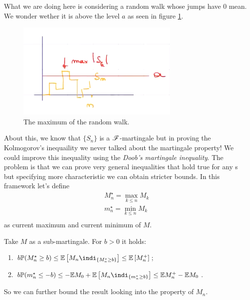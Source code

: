 \documentclass{report}
\begin{document}
What we are doing here is considering a random walk whose jumps have 0 mean. We wonder wether it is above the level $a$ as seen in figure \ref{fig:screenshot017}.
\begin{figure}[h]
	\centering
	\includegraphics[width=0.6\linewidth]{screenshot017}
	\caption{The maximum of the random walk.}
	\label{fig:screenshot017}
\end{figure}
About this, we know that $\{S_{n}\}$ is a $\mathscr{F}$-martingale but in proving the Kolmogorov's inequaility we never talked about the martingale property! We could improve this inequality using the \emph{Doob's martingale inequality}. The problem is that we can prove very general inequalities that hold true for any \rv s but specifying more characteristic we can obtain stricter bounds. In this framework let's define 
\begin{equation*}
	\begin{array}{l}
		M^{\star}_{n}=\max_{k\leq n}M_{k}\\
		m^{\star}_{n}=\min_{k\leq n}M_{k}\\
	\end{array}
\end{equation*}
as current maximum and current minimum of $M$.
\begin{theorem}
	Take $M$ as a sub-martingale. For $b>0$ it holds:
	\begin{enumerate}
		\item $b\pr(M^{\star}_{n}\geq b)\leq\ev\left[M_{n}\indi_{\{M_{n}^{\star}\geq b\}}\right]\leq\ev\left[M_{n}^{+}\right]$;
		\item $b\pr(m^{\star}_{n}\leq-b)\leq-\ev M_{0}+\ev\left[M_{n}\indi_{\{m_{n}^{\star}\geq b\}}\right]\leq\ev M_{n}^{+}-\ev M_{0}$.
	\end{enumerate}
\end{theorem}
So we can further bound the result looking into the property of $M_{n}$.
\end{document}
